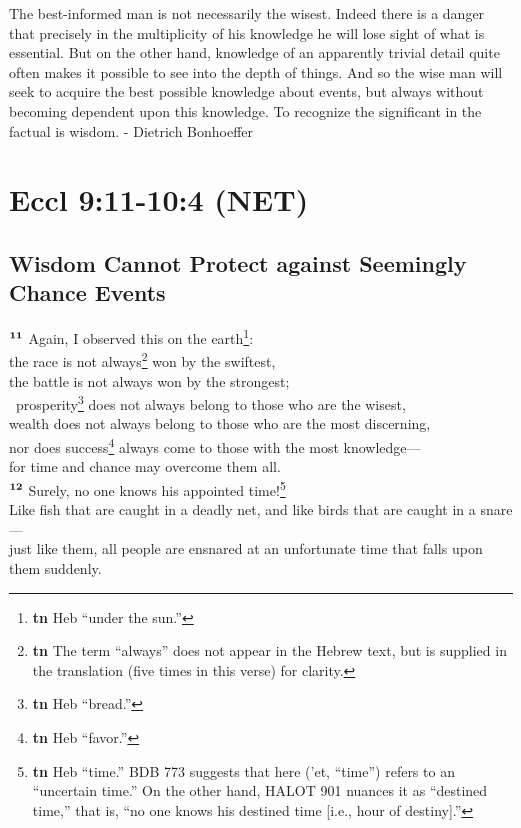 \documentclass[10pt,a4paper,final, onecolumn]{article}
\renewcommand{\textsuperscript}[1]{\ensuremath{^{\textbf{\scriptsize #1}}}}
\begin{document}
The best-informed man is not necessarily the wisest. Indeed there is a danger that precisely in the multiplicity of his knowledge he will lose sight of what is essential. But on the other hand, knowledge of an apparently trivial detail quite often makes it possible to see into the depth of things. And so the wise man will seek to acquire the best possible knowledge about events, but always without becoming dependent upon this knowledge. To recognize the significant in the factual is wisdom. - Dietrich Bonhoeffer

\section*{Eccl 9:11-10:4 (NET)}


\subsection*{Wisdom Cannot Protect against Seemingly Chance Events}


    \textsuperscript{11} Again, I observed this on the earth\footnote{\textbf{tn} Heb “under the sun.”}: \\
    the race is not always\footnote{\textbf{tn} The term ``always” does not appear in the Hebrew text, but is supplied in the translation (five times in this verse) for clarity.} won by the swiftest, \\
    the battle is not always won by the strongest;\\\ 
    prosperity\footnote{\textbf{tn} Heb ``bread.”} does not always belong to those who are the wisest, \\
    wealth does not always belong to those who are the most discerning, \\
    nor does success\footnote{\textbf{tn} Heb ``favor.”} always come to those with the most knowledge— \\
    for time and chance may overcome them all. \\
    \textsuperscript{12} Surely, no one knows his appointed time!\footnote{\textbf{tn} Heb “time.” BDB 773 suggests that here (’et, ``time”) refers to an ``uncertain time.” On the other hand, HALOT 901 nuances it as ``destined time,” that is, ``no one knows his destined time [i.e., hour of destiny].”} \\
    Like fish that are caught in a deadly net, and like birds that are caught in a snare— \\
    just like them, all people are ensnared at an unfortunate time that falls upon them suddenly. \\
\end{document}
